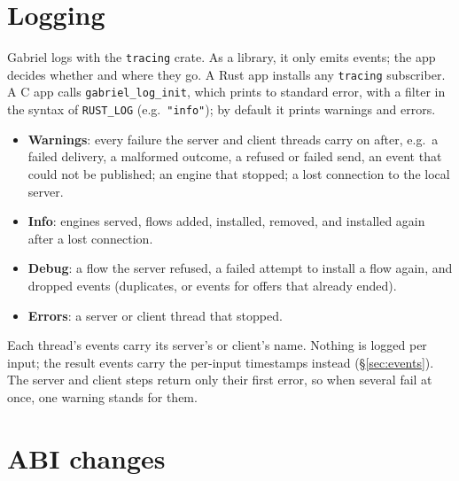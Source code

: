 \documentclass[11pt]{article}
\newcommand{\code}[1]{\texttt{#1}}
\begin{document}
\section{Logging}
\label{sec:logging}

Gabriel logs with the \code{tracing} crate. As a library, it only emits
events; the app decides whether and where they go. A Rust app installs any
\code{tracing} subscriber. A C app calls \code{gabriel\_log\_init}, which
prints to standard error, with a filter in the syntax of \code{RUST\_LOG}
(e.g.\ \code{"info"}); by default it prints warnings and errors.
\begin{itemize}[nosep]
  \item \textbf{Warnings}: every failure the server and client threads carry
        on after, e.g.\ a failed delivery, a malformed outcome, a refused or
        failed send, an event that could not be published; an engine that
        stopped; a lost connection to the local server.
  \item \textbf{Info}: engines served, flows added, installed, removed, and
        installed again after a lost connection.
  \item \textbf{Debug}: a flow the server refused, a failed attempt to
        install a flow again, and dropped events (duplicates, or events for
        offers that already ended).
  \item \textbf{Errors}: a server or client thread that stopped.
\end{itemize}
Each thread's events carry its server's or client's name. Nothing is logged
per input; the result events carry the per-input timestamps instead
(\S\ref{sec:events}).
The server and client steps return only their first error, so when several
fail at once, one warning stands for them.

\section{ABI changes}
\end{document}
